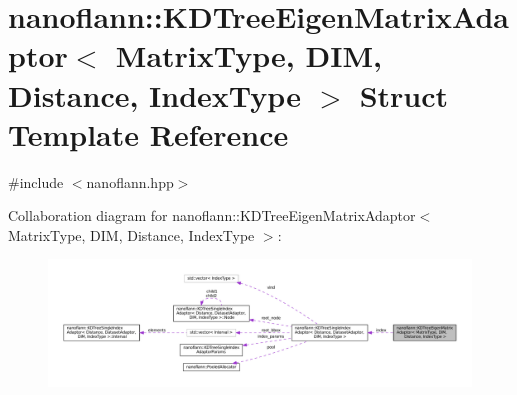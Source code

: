 \hypertarget{structnanoflann_1_1_k_d_tree_eigen_matrix_adaptor}{\section{nanoflann\-:\-:K\-D\-Tree\-Eigen\-Matrix\-Adaptor$<$ Matrix\-Type, D\-I\-M, Distance, Index\-Type $>$ Struct Template Reference}
\label{structnanoflann_1_1_k_d_tree_eigen_matrix_adaptor}
}


{\ttfamily \#include $<$nanoflann.\-hpp$>$}



Collaboration diagram for nanoflann\-:\-:K\-D\-Tree\-Eigen\-Matrix\-Adaptor$<$ Matrix\-Type, D\-I\-M, Distance, Index\-Type $>$\-:\nopagebreak
\begin{figure}[H]
\begin{center}
\leavevmode
\includegraphics[width=350pt]{structnanoflann_1_1_k_d_tree_eigen_matrix_adaptor__coll__graph}
\end{center}
\end{figure}
